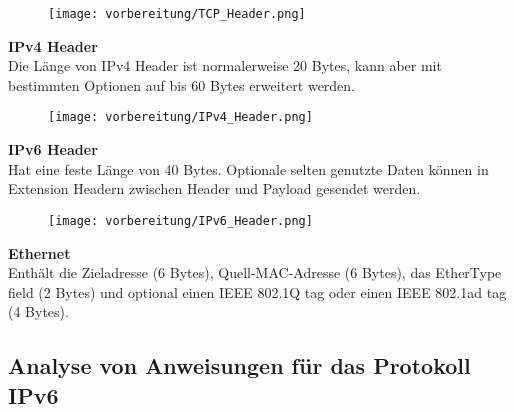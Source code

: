     \begin{figure}[H]
        \centering
        \texttt{[image: vorbereitung/TCP\_Header.png]}
    \end{figure}

    \textbf{IPv4 Header}
    \\
    Die Länge von IPv4 Header ist normalerweise 20 Bytes, kann aber mit bestimmten Optionen auf bis 60 Bytes erweitert werden.\\

    \begin{figure}[H]
        \centering
        \texttt{[image: vorbereitung/IPv4\_Header.png]}
    \end{figure}

    \textbf{IPv6 Header}
    \\
    Hat eine feste Länge von 40 Bytes. Optionale selten genutzte Daten können in Extension Headern zwischen Header und Payload gesendet werden.\\

    \begin{figure}[H]
        \centering
        \texttt{[image: vorbereitung/IPv6\_Header.png]}
    \end{figure}

    \textbf{Ethernet}
    \\
    Enthält die Zieladresse (6 Bytes), Quell-MAC-Adresse (6 Bytes), das EtherType field (2 Bytes) und optional einen IEEE 802.1Q tag oder einen IEEE 802.1ad tag (4 Bytes).

\subsection{Analyse von Anweisungen für das Protokoll IPv6}
    